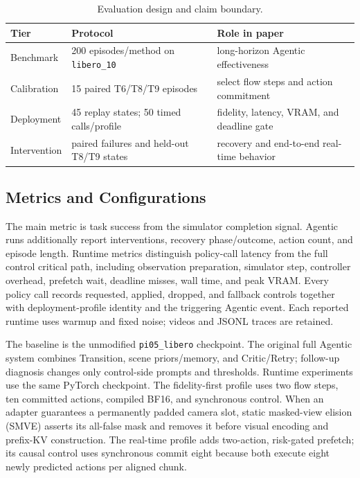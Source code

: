 \documentclass[runningheads]{waica}
\begin{document}
\begin{table}
\caption{Evaluation design and claim boundary.}
\label{tab:evidence}
\centering
\small
\begin{tabularx}{\textwidth}{p{}p{}X}
\toprule
Tier & Protocol & Role in paper \\
\midrule
Benchmark & 200 episodes/method on \texttt{libero\_10} & long-horizon Agentic effectiveness \\
Calibration & 15 paired T6/T8/T9 episodes & select flow steps and action commitment \\
Deployment & 45 replay states; 50 timed calls/profile & fidelity, latency, VRAM, and deadline gate \\
Intervention & paired failures and held-out T8/T9 states & recovery and end-to-end real-time behavior \\
\bottomrule
\end{tabularx}
\end{table}

\subsection{Metrics and Configurations}

The main metric is task success from the simulator completion signal. Agentic
runs additionally report interventions, recovery phase/outcome, action count,
and episode length. Runtime metrics distinguish policy-call latency from the
full control critical path, including observation preparation, simulator step,
controller overhead, prefetch wait, deadline misses, wall time, and peak VRAM.
Every policy call records requested, applied, dropped, and fallback controls
together with deployment-profile identity and the triggering Agentic event.
Each reported runtime uses warmup and fixed noise; videos and JSONL traces are
retained.

The baseline is the unmodified \texttt{pi05\_libero} checkpoint. The original
full Agentic system combines Transition, scene priors/memory, and Critic/Retry;
follow-up diagnosis changes only control-side prompts and thresholds. Runtime
experiments use the same PyTorch checkpoint. The fidelity-first profile uses
two flow steps, ten committed actions, compiled BF16, and synchronous control.
When an adapter guarantees a permanently padded camera slot, static masked-view
elision (SMVE) asserts its all-false mask and removes it before visual encoding
and prefix-KV construction.
The real-time profile adds two-action, risk-gated prefetch; its causal control
uses synchronous commit eight because both execute eight newly predicted
actions per aligned chunk.
\end{document}
